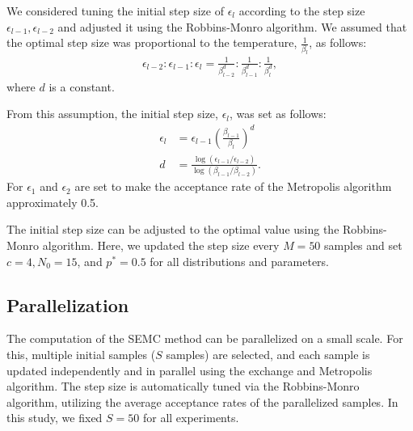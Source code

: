\documentclass[12pt]{article}
\begin{document}
We considered tuning the initial step size of $\epsilon_l$ according to the step size $\epsilon_{l-1}, \epsilon_{l-2}$ and adjusted it using the Robbins-Monro algorithm.
We assumed that the optimal step size was proportional to the temperature, $\frac{1}{\beta_l}$, as follows:
\begin{align}
    \epsilon_{l-2}: \epsilon_{l-1}: \epsilon_{l} = \frac{1}{\beta_{l-2}^d}:\frac{1}{\beta_{l-1}^d}:\frac{1}{\beta_{l}^d},
\end{align}
where $d$ is a constant. \par
From this assumption, the initial step size, $\epsilon_l$, was set as follows:
\begin{align}
    \epsilon_{l} &= \epsilon_{l-1}\left(\frac{\beta_{l-1}}{\beta_{l}}\right)^{d} \\
    \label{eq:initial_epsilon}
    d &= \frac{\log(\epsilon_{l-1}/\epsilon_{l-2})}{\log(\beta_{l-1}/\beta_{l-2})}.
\end{align}
For $\epsilon_1$ and $\epsilon_2$ are set to make the acceptance rate of the Metropolis algorithm approximately 0.5.
\par
The initial step size can be adjusted to the optimal value using the Robbins-Monro algorithm.
Here, we updated the step size every $M = 50$ samples and set $c = 4, N_0 = 15$, and $p^* = 0.5$ for all distributions and parameters. \par

\subsection{Parallelization}
The computation of the SEMC method can be parallelized on a small scale. 
For this, multiple initial samples ($S$ samples) are selected, and each sample is updated independently and in parallel using the exchange and Metropolis algorithm. 
The step size is automatically tuned via the Robbins-Monro algorithm, utilizing the average acceptance rates of the parallelized samples. 
In this study, we fixed $S=50$ for all experiments. \par
\end{document}
